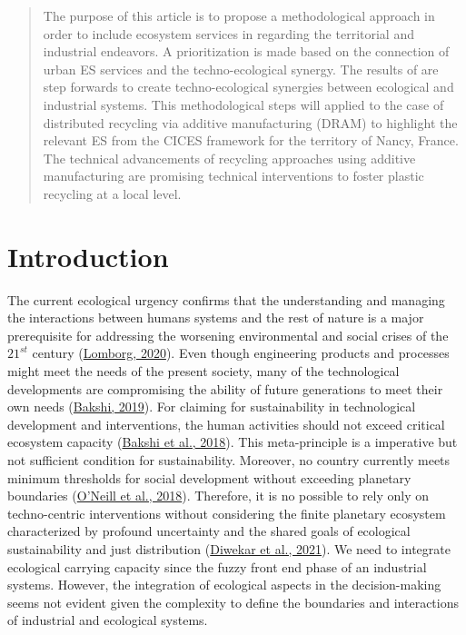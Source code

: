\documentclass[]{elsarticle} %
\begin{document}
\begin{frontmatter}
\begin{abstract}
  The purpose of this article is to propose a methodological approach in order to include ecosystem services in regarding the territorial and industrial endeavors.
  A prioritization is made based on the connection of urban ES services and the techno-ecological synergy.
  The results of are step forwards to create techno-ecological synergies between ecological and industrial systems.
  This methodological steps will applied to the case of distributed recycling via additive manufacturing (DRAM) to highlight the relevant ES from the CICES framework for the territory of Nancy, France.
  The technical advancements of recycling approaches using additive manufacturing are promising technical interventions to foster plastic recycling at a local level.
  \end{abstract}
  
 \end{frontmatter}

\linenumbers

\hypertarget{introduction}{%
\section{Introduction}\label{introduction}}

The current ecological urgency confirms that the understanding and managing the interactions between humans systems and the rest of nature is a major prerequisite for addressing the worsening environmental and social crises of the \(21^{st}\) century (\protect\hyperlink{ref-Lomborg2020}{Lomborg, 2020}).
Even though engineering products and processes might meet the needs of the present society, many of the technological developments are compromising the ability of future generations to meet their own needs (\protect\hyperlink{ref-Bakshi2019a}{Bakshi, 2019}).
For claiming for sustainability in technological development and interventions, the human activities should not exceed critical ecosystem capacity (\protect\hyperlink{ref-Bakshi2018}{Bakshi et al., 2018}).
This meta-principle is a imperative but not sufficient condition for sustainability.
Moreover, no country currently meets minimum thresholds for social development without exceeding planetary boundaries (\protect\hyperlink{ref-ONeill2018}{O'Neill et al., 2018}).
Therefore, it is no possible to rely only on techno-centric interventions without considering the finite planetary ecosystem characterized by profound uncertainty and the shared goals of ecological sustainability and just distribution (\protect\hyperlink{ref-Diwekar2021}{Diwekar et al., 2021}).
We need to integrate ecological carrying capacity since the fuzzy front end phase of an industrial systems.
However, the integration of ecological aspects in the decision-making seems not evident given the complexity to define the boundaries and interactions of industrial and ecological systems.
\end{document}
